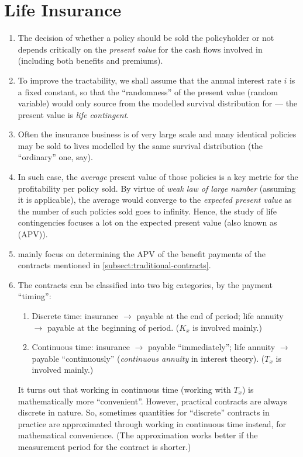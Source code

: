 \section{Life Insurance}
\label{sect:life-insurance}
\begin{enumerate}
\item The decision of whether a policy  should be sold the
policyholder  or not depends critically on the \emph{present
value} for the cash flows involved in  (including both
benefits and premiums).
\item To improve the tractability, we shall assume that the annual interest
rate \(i\) is a fixed constant, so that the ``randomness'' of the present value
(random variable) would only source from the modelled survival distribution for
 --- the present value is \emph{life contingent}.
\item Often the insurance business  is of very
large scale and many identical policies may be sold to lives modelled by the
same survival distribution (the ``ordinary'' one, say).
\item In such case, the \emph{average} present value of those policies is a
key metric for the profitability per policy sold. By virtue of \emph{weak
law of large number} (assuming it is applicable), the average would converge to
the \emph{expected present value} as the number of such policies sold
goes to infinity. Hence, the study of life contingencies focuses a lot on the
expected present value (also known as  (APV)).
\item {} mainly focus on determining
the APV of the benefit payments of the contracts mentioned in
\cref{subsect:traditional-contracts}.
\item The contracts can be classified into two big categories, by the payment
``timing'':
\begin{enumerate}
\item Discrete time: insurance \(\rightarrow\) payable at the end of period;
life annuity \(\rightarrow\) payable at the beginning of period. (\(K_x\) is
involved mainly.)
\item Continuous time: insurance \(\rightarrow\) payable ``immediately''; life
annuity \(\rightarrow\) payable ``continuously'' (\emph{continuous annuity} in
interest theory). (\(T_x\) is involved mainly.)
\end{enumerate}
It turns out that working in continuous time (working with \(T_x\)) is
mathematically more ``convenient''. However, practical contracts are always
discrete in nature. So, sometimes quantities for ``discrete'' contracts in
practice are approximated through working in continuous time instead, for
mathematical convenience. (The approximation works better if the measurement
period for the contract is shorter.)


\end{enumerate}

